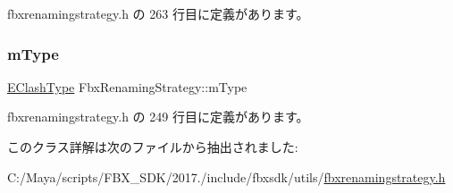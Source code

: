  fbxrenamingstrategy.\+h の 263 行目に定義があります。

\mbox{\label{class_fbx_renaming_strategy_a9871e311bddf13b0263f71e646f5b06d}} 
\subsubsection{\texorpdfstring{m\+Type}{mType}}
{\footnotesize\ttfamily \hyperlink{class_fbx_renaming_strategy_aacebe214cec13a6cdbbc9e40d16c57dd}{E\+Clash\+Type} Fbx\+Renaming\+Strategy\+::m\+Type\hspace{0.3cm}{\ttfamily [protected]}}



 fbxrenamingstrategy.\+h の 249 行目に定義があります。



このクラス詳解は次のファイルから抽出されました\+:\begin{DoxyCompactItemize}
\item 
C\+:/\+Maya/scripts/\+F\+B\+X\+\_\+\+S\+D\+K/2017./include/fbxsdk/utils/\hyperlink{fbxrenamingstrategy_8h}{fbxrenamingstrategy.\+h}\end{DoxyCompactItemize}
